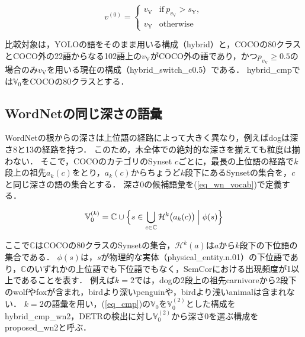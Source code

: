 \begin{equation}
    v^{(0)} =
    \begin{cases}
        v_{\mathrm{V}} & \mathrm{if} \ p_{v_{\mathrm{V}}} > s_{\mathrm{Y}}, \\
        v_{\mathrm{Y}} & \mathrm{otherwise}
    \end{cases}
    \label{eq_cmp}
\end{equation}

\noindent
比較対象は，YOLOの語をそのまま用いる構成（hybrid）と，COCOの80クラスとCOCO外の22語からなる102語上の$ v_{\mathrm{V}} $がCOCO外の語であり，かつ$ p_{v_{\mathrm{V}}} \geq 0.5 $の場合のみ$ v_{\mathrm{V}} $を用いる現在の構成（hybrid\_switch\_c0.5）である．
hybrid\_cmpでは$ {\mathbb V}_0 $をCOCOの80クラスとする．

\subsection{WordNetの同じ深さの語彙}
WordNetの根からの深さは上位語の経路によって大きく異なり，例えばdogは深さ8と13の経路を持つ．
このため，木全体での絶対的な深さを揃えても粒度は揃わない．
そこで，COCOのカテゴリのSynset $ c $ごとに，最長の上位語の経路で$ k $段上の祖先$ a_k(c) $をとり，$ a_k(c) $からちょうど$ k $段下にあるSynsetの集合を，$ c $と同じ深さの語の集合とする．
深さ0の候補語彙を(\ref{eq_wn_vocab})で定義する．

\begin{equation}
    {\mathbb V}_0^{(k)} = {\mathbb C} \cup \Bigl\{ s \in \bigcup_{c \in {\mathbb C}} {\mathcal H}^{k}\bigl(a_k(c)\bigr) \Bigm| \phi(s) \Bigr\}
    \label{eq_wn_vocab}
\end{equation}

\noindent
ここで$ {\mathbb C} $はCOCOの80クラスのSynsetの集合，$ {\mathcal H}^{k}(a) $は$ a $から$ k $段下の下位語の集合である．
$ \phi(s) $は，$ s $が物理的な実体（physical\_entity.n.01）の下位語であり，$ {\mathbb C} $のいずれかの上位語でも下位語でもなく，SemCor\cite{ref_SemCor}における出現頻度が1以上であることを表す．
例えば$ k = 2 $では，dogの2段上の祖先carnivoreから2段下のwolfやfoxが含まれ，birdより深いpenguinや，birdより浅いanimalは含まれない．
$ k = 2 $の語彙を用い，(\ref{eq_cmp})の$ {\mathbb V}_0 $を$ {\mathbb V}_0^{(2)} $とした構成をhybrid\_cmp\_wn2，DETRの検出に対し$ {\mathbb V}_0^{(2)} $から深さ0を選ぶ構成をproposed\_wn2と呼ぶ．
